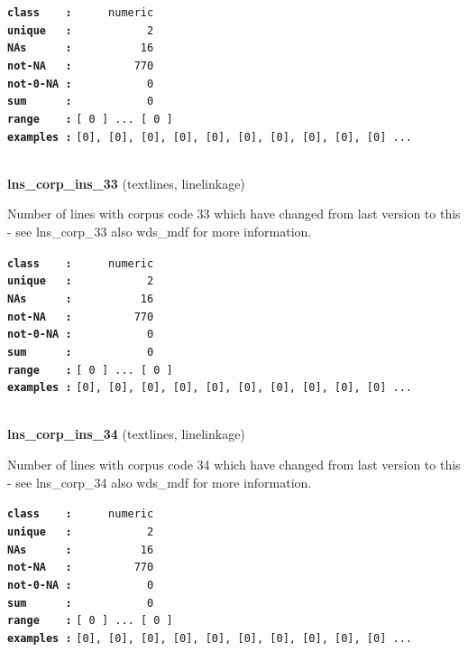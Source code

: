 \documentclass[]{article}
\begin{document}
\textbf{\texttt{class\ \ \ \ :}} \texttt{~~~~~numeric}\\
\textbf{\texttt{unique\ \ \ :}} \texttt{~~~~~~~~~~~2}\\
\textbf{\texttt{NAs\ \ \ \ \ \ :}} \texttt{~~~~~~~~~~16}\\
\textbf{\texttt{not-NA\ \ \ :}} \texttt{~~~~~~~~~770}\\
\textbf{\texttt{not-0-NA\ :}} \texttt{~~~~~~~~~~~0}\\
\textbf{\texttt{sum\ \ \ \ \ \ :}} \texttt{~~~~~~~~~~~0}\\
\textbf{\texttt{range\ \ \ \ :}}
\texttt{{[}\ 0\ {]}\ ...\ {[}\ 0\ {]}}\\
\textbf{\texttt{examples\ :}}
\texttt{{[}0{]},\ {[}0{]},\ {[}0{]},\ {[}0{]},\ {[}0{]},\ {[}0{]},\ {[}0{]},\ {[}0{]},\ {[}0{]},\ {[}0{]}\ ...}\\

~

\textbf{lns\_corp\_ins\_33} (textlines, linelinkage)

Number of lines with corpus code 33 which have changed from last version
to this - see lns\_corp\_33 also wds\_mdf for more information.

\textbf{\texttt{class\ \ \ \ :}} \texttt{~~~~~numeric}\\
\textbf{\texttt{unique\ \ \ :}} \texttt{~~~~~~~~~~~2}\\
\textbf{\texttt{NAs\ \ \ \ \ \ :}} \texttt{~~~~~~~~~~16}\\
\textbf{\texttt{not-NA\ \ \ :}} \texttt{~~~~~~~~~770}\\
\textbf{\texttt{not-0-NA\ :}} \texttt{~~~~~~~~~~~0}\\
\textbf{\texttt{sum\ \ \ \ \ \ :}} \texttt{~~~~~~~~~~~0}\\
\textbf{\texttt{range\ \ \ \ :}}
\texttt{{[}\ 0\ {]}\ ...\ {[}\ 0\ {]}}\\
\textbf{\texttt{examples\ :}}
\texttt{{[}0{]},\ {[}0{]},\ {[}0{]},\ {[}0{]},\ {[}0{]},\ {[}0{]},\ {[}0{]},\ {[}0{]},\ {[}0{]},\ {[}0{]}\ ...}\\

~

\textbf{lns\_corp\_ins\_34} (textlines, linelinkage)

Number of lines with corpus code 34 which have changed from last version
to this - see lns\_corp\_34 also wds\_mdf for more information.

\textbf{\texttt{class\ \ \ \ :}} \texttt{~~~~~numeric}\\
\textbf{\texttt{unique\ \ \ :}} \texttt{~~~~~~~~~~~2}\\
\textbf{\texttt{NAs\ \ \ \ \ \ :}} \texttt{~~~~~~~~~~16}\\
\textbf{\texttt{not-NA\ \ \ :}} \texttt{~~~~~~~~~770}\\
\textbf{\texttt{not-0-NA\ :}} \texttt{~~~~~~~~~~~0}\\
\textbf{\texttt{sum\ \ \ \ \ \ :}} \texttt{~~~~~~~~~~~0}\\
\textbf{\texttt{range\ \ \ \ :}}
\texttt{{[}\ 0\ {]}\ ...\ {[}\ 0\ {]}}\\
\textbf{\texttt{examples\ :}}
\texttt{{[}0{]},\ {[}0{]},\ {[}0{]},\ {[}0{]},\ {[}0{]},\ {[}0{]},\ {[}0{]},\ {[}0{]},\ {[}0{]},\ {[}0{]}\ ...}\\
\end{document}

